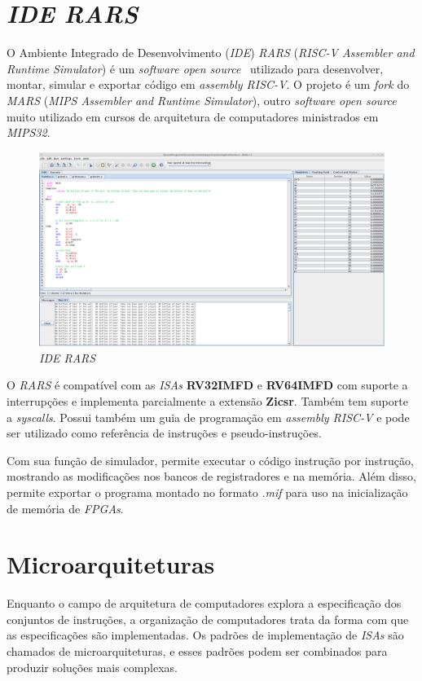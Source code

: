 \section{\textit{IDE RARS}}\label{rars_cap2}
{ O Ambiente Integrado de Desenvolvimento (\textit{IDE}) \textit{RARS}
    (\textit{RISC-V Assembler and Runtime Simulator}) é um \textit{software
    open source}~\cite{rars_git} utilizado para desenvolver, montar, simular e
    exportar código em \textit{assembly RISC-V}. O projeto é um \textit{fork}
    do \textit{MARS} (\textit{MIPS Assembler and Runtime Simulator}), outro
    \textit{software open source}~\cite{mars_site} muito utilizado em cursos
    de arquitetura de computadores ministrados em \textit{MIPS32}.
}
\begin{figure}[H]
\centering
    \includegraphics[width=.9\linewidth]{../images/rars.png}
    \caption{\textit{IDE RARS}}\label{fig:rars}
\end{figure}

{ O \textit{RARS} é compatível com as \textit{ISAs} \textbf{RV32IMFD} e
    \textbf{RV64IMFD} com suporte a interrupções e implementa parcialmente a
    extensão \textbf{Zicsr}. Também tem suporte a \textit{syscalls}. Possui
    também um guia de programação em \textit{assembly RISC-V} e pode ser
    utilizado como referência de instruções e pseudo-instruções.
}

{ Com sua função de simulador, permite executar o código instrução por instrução,
    mostrando as modificações nos bancos de registradores e na memória. Além
    disso, permite exportar o programa montado no formato \textit{.mif} para
    uso na inicialização de memória de \textit{FPGAs}.
}


\section{Microarquiteturas}
{ Enquanto o campo de arquitetura de computadores explora a especificação dos
    conjuntos de instruções, a organização de computadores trata da forma com que
    as especificações são implementadas. Os padrões de implementação de
    \textit{ISAs} são chamados de microarquiteturas, e esses padrões podem ser
    combinados para produzir soluções mais complexas.
}

